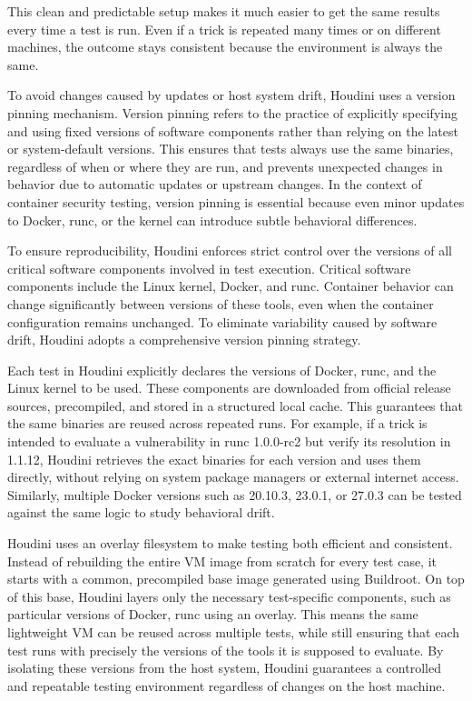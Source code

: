 \documentclass[12pt]{report}
\begin{document}
\begin{doublespace}
This clean and predictable setup makes it much easier to get the same results every time a test is run. Even if a trick is repeated many times or on different machines, the outcome stays consistent because the environment is always the same.

To avoid changes caused by updates or host system drift, Houdini uses a version pinning mechanism. Version pinning refers to the practice of explicitly specifying and using fixed versions of software components rather than relying on the latest or system-default versions. This ensures that tests always use the same binaries, regardless of when or where they are run, and prevents unexpected changes in behavior due to automatic updates or upstream changes. In the context of container security testing, version pinning is essential because even minor updates to Docker, runc, or the kernel can introduce subtle behavioral differences.

To ensure reproducibility, Houdini enforces strict control over the versions of all critical software components involved in test execution. Critical software components include the Linux kernel, Docker, and runc. Container behavior can change significantly between versions of these tools, even when the container configuration remains unchanged. To eliminate variability caused by software drift, Houdini adopts a comprehensive version pinning strategy.

Each test in Houdini explicitly declares the versions of Docker, runc, and the Linux kernel to be used. These components are downloaded from official release sources, precompiled, and stored in a structured local cache. This guarantees that the same binaries are reused across repeated runs. For example, if a trick is intended to evaluate a vulnerability in runc 1.0.0-rc2 but verify its resolution in 1.1.12, Houdini retrieves the exact binaries for each version and uses them directly, without relying on system package managers or external internet access. Similarly, multiple Docker versions such as 20.10.3, 23.0.1, or 27.0.3 can be tested against the same logic to study behavioral drift.

Houdini uses an overlay filesystem to make testing both efficient and consistent. Instead of rebuilding the entire VM image from scratch for every test case, it starts with a common, precompiled base image generated using Buildroot. On top of this base, Houdini layers only the necessary test-specific components, such as particular versions of Docker, runc using an overlay. This means the same lightweight VM can be reused across multiple tests, while still ensuring that each test runs with precisely the versions of the tools it is supposed to evaluate. By isolating these versions from the host system, Houdini guarantees a controlled and repeatable testing environment regardless of changes on the host machine.



\end{doublespace}
\end{document}
